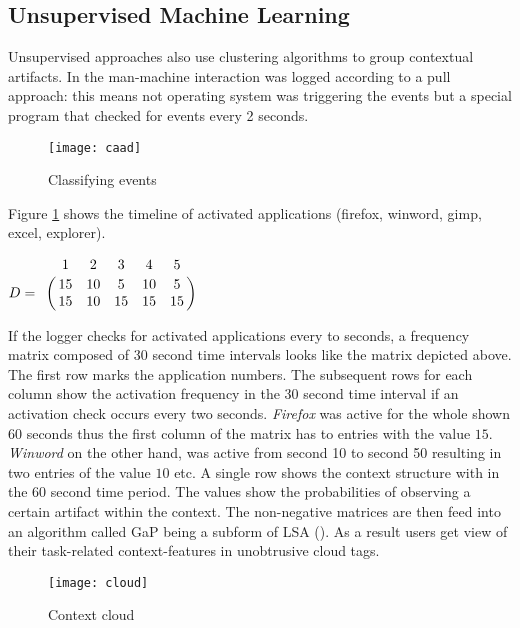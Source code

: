 \subsection{Unsupervised Machine Learning}
Unsupervised approaches also use clustering algorithms to group contextual artifacts. In \cite{rattenbury2007caad} the man-machine interaction was logged according to a pull approach: this means not operating system was triggering the events but a special program that checked for events every 2 seconds. 

\begin{figure}[ht]
	\centering
  \texttt{[image: caad]}
	\caption{Classifying events}
	\label{fig3}
\end{figure}

Figure \ref{fig3} shows the timeline of activated applications (firefox, winword, gimp, excel, explorer).

\begin{center}
  \begin{math}
  D=
  \bordermatrix{
  & 1 & 2 & 3 & 4 & 5 \cr
  & 15 & 10 & 5 & 10 & 5\cr
  & 15 & 10 & 15 & 15 & 15}
  \end{math}\\
\end{center}

If the logger checks for activated applications every to seconds, a frequency matrix composed of 30 second time intervals looks like the matrix depicted above. The first row marks the application numbers. The subsequent rows for each column show the activation frequency in the 30 second time interval if an activation check occurs every two seconds. \textit{Firefox} was active for the whole shown 60 seconds thus the first column of the matrix has to entries with the value $15$. \textit{Winword} on the other hand, was active from second 10 to second 50 resulting in two entries of the value $10$ etc. A single row shows the context structure with in the 60 second time period. The values show the probabilities of observing a certain artifact within the context. The non-negative matrices are then feed into an algorithm called \ac{GaP} being a subform of \ac{LSA} (\cite{canny2004gap}). As a result users get view of their task-related context-features in unobtrusive cloud tags.

\begin{figure}[ht]
	\centering
  \texttt{[image: cloud]}
	\caption{Context cloud}
	\label{fig4}
\end{figure}

  
